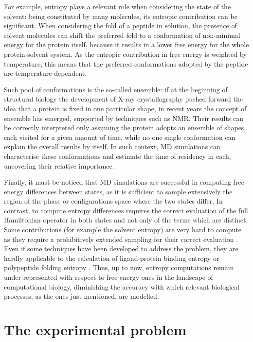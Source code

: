For example, entropy plays a relevant role when considering the state of the solvent: being constituted by many molecules, its entropic contribution can be significant. When considering the fold of a peptide in solution, the presence of solvent molecules can shift the preferred fold to a conformation of non-minimal energy for the protein itself, because it results in a lower free energy for the whole protein-solvent system.
%
As the entropic contribution in free energy is weighted by temperature, this means that the preferred conformations adopted by the peptide are temperature-dependent.

Such pool of conformations is the so-called ensemble: if at the beginning of structural biology the development of X-ray crystallography pushed forward the idea that a protein is fixed in one particular shape, in recent years the concept of ensemble has emerged, supported by techniques such as NMR. Their results can be correctly interpreted only assuming the protein adopts an ensemble of shapes, each visited for a given amount of time, while no one single conformation can explain the overall results by itself. In such context, MD simulations can characterise these conformations and estimate the time of residency in each, uncovering their relative importance.

Finally, it must be noticed that MD simulations are successful in computing free energy differences between states, as it is sufficient to sample extensively the region of the phase or configurations space where the two states differ. In contrast, to compute entropy differences requires the correct evaluation of the full Hamiltonian operator in both states and not only of the terms which are distinct.
%
Some contributions (for example the solvent entropy) are very hard to compute as they require a prohibitively extended sampling for their correct evaluation \cite{142}.
%
Even if some techniques have been developed to address the problem, they are hardly applicable to the calculation of ligand-protein binding entropy or polypeptide folding entropy \cite{142}. Thus, up to now, entropy computations remain under-represented with respect to free energy ones in the landscape of computational biology, diminishing the accuracy with which relevant biological processes, as the ones just mentioned, are modelled.


\section{The experimental problem}

